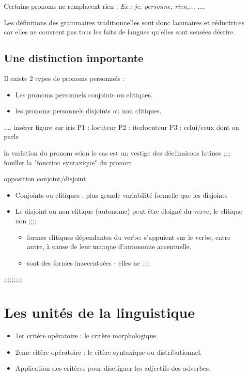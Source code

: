      Certains pronoms ne remplacent rien :
     \textit{Ex.: je, personne, rien,...}
....



Les définitions des grammaires traditionnelles sont donc lacunaires et réductrices car elles ne couvrent pas tous les faits de langues qu'elles sont sensées décrire.

\subsection{Une distinction importante}
Il existe 2 types de pronoms personnels :
\begin{itemize}
   \item Les pronoms personnels conjoints ou clitiques.
   \item les pronoms personnels disjoints ou non clitiques.
\end{itemize}

.... insérer figure sur iris
P1 : locuteur
P2 : iterlocuteur
P3 : celui/ceux dont on parle

la variation du pronom selon le cas est un vestige des déclinaisons latines
;;;; fouiller la "fonction syntaxique" du pronom

opposition conjoint/disjoint
\begin{itemize}
   \item Conjoints ou clitiques : plus grande variabilité formelle que les disjoints
   \item Le disjoint ou non clitique (autonome) peut être éloigné du verve, le clitique non 
   ;;;;
  \begin{itemize} 
   \item formes clitiques dépendantes du verbe: s'appuient sur le verbe, entre autre, à cause de leur manque d'autonomie accentuelle.
   \item sont des formes inaccentuées - elles ne ;;;;
  \end{itemize}
\end{itemize}

;;;;;;;;;;
 

\section{Les unités de la linguistique}
\begin{itemize}
   \item 1er critère opératoire : le critère morphologique.
   \item 2eme citère opératoire : le citère syntaxique ou distributionnel.
   \item Application des critères pour disctiguer les adjectifs des adverbes.
\end{itemize}

